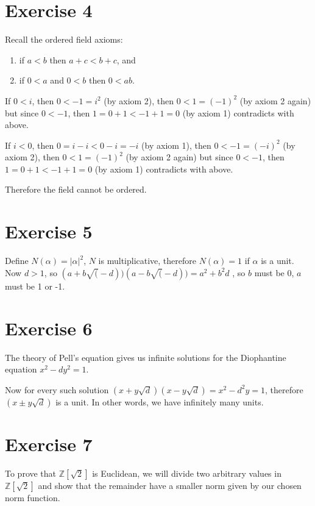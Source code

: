 \documentclass{article}
\begin{document}
\section*{Exercise 4}
Recall the ordered field axioms:

\begin{enumerate}
    \item if $ a < b $ then $ a + c < b + c $, and 
    \item if $ 0 < a $ and $ 0 < b $ then $ 0 < ab $.
\end{enumerate}

If $ 0 < i $, then $ 0 < -1 = i^2 $ (by axiom 2), then $ 0 < 1 = (-1)^2 $ (by axiom 2 again)
but since $ 0 < -1 $, then $ 1 = 0 + 1 < -1 + 1 = 0 $ (by axiom 1) contradicts with above.

If $ i < 0 $, then $ 0 = i - i < 0 - i = -i $ (by axiom 1), then $ 0 < -1 = (-i)^2 $ (by axiom 2), then $ 0 < 1 = (-1)^2 $ (by axiom 2 again)
but since $ 0 < -1 $, then $ 1 = 0 + 1 < -1 + 1 = 0 $ (by axiom 1) contradicts with above.

Therefore the field cannot be ordered.

\section*{Exercise 5}

Define $ N(\alpha) = |\alpha|^2 $, $ N $ is multiplicative, therefore $ N(\alpha) = 1 $ if $ \alpha $ is a unit. Now $ d > 1 $, so $ (a + b\sqrt(-d))(a - b\sqrt(-d)) = a^2 + b^2d $ , so $ b $ must be 0, $ a $ must be 1 or -1.

\section*{Exercise 6}

The theory of Pell's equation gives us infinite solutions for the Diophantine equation $ x^2 - dy^2 = 1 $.

Now for every such solution $ (x + y \sqrt{d})(x - y \sqrt{d}) = x^2 - d^2y = 1 $, therefore $ (x \pm y \sqrt{d}) $ is a unit. In other words, we have infinitely many units.

\section*{Exercise 7}
To prove that $ \mathbb{Z}[\sqrt{2}] $ is Euclidean, we will divide two arbitrary values in $ \mathbb{Z}[\sqrt{2}] $ and show that the remainder have a smaller norm given by our chosen norm function. 
\end{document}
